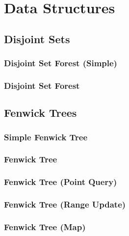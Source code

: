 \chapter{Data Structures}

\section{Disjoint Sets}
\setcounter{section}{1}
\setcounter{subsection}{0}
\subsection{Disjoint Set Forest (Simple)}

\subsection{Disjoint Set Forest}


\section{Fenwick Trees}
\setcounter{section}{2}
\setcounter{subsection}{0}
\subsection{Simple Fenwick Tree}

\subsection{Fenwick Tree}

\subsection{Fenwick Tree (Point Query)}

\subsection{Fenwick Tree (Range Update)}

\subsection{Fenwick Tree (Map)}

